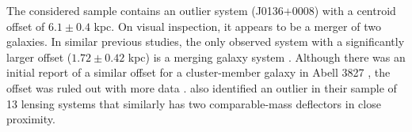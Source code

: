 \documentclass{aa}
\begin{document}
The considered sample contains an outlier system (J0136$+$0008) with a centroid offset of $6.1\pm0.4$ kpc. On visual inspection,
it appears to be a merger of two galaxies. In similar previous studies, the only observed system with a significantly larger offset ($1.72\pm 0.42$ kpc) is a merging galaxy system \citep{Shu16}. Although there was an initial report of a similar offset for a cluster-member galaxy in Abell 3827 \citep{Williams11, Massey15}, the offset was ruled out with more data \citep{Massey18}. \citet{Shajib19} also identified an outlier in their sample of 13 lensing systems that similarly has two comparable-mass deflectors in close proximity.



\end{document}
